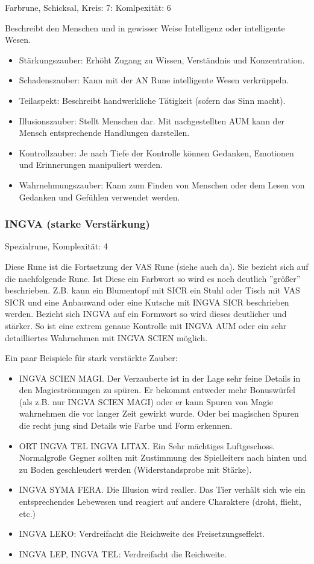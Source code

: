 \documentclass{article}
\begin{document}
Farbrune, Schicksal, Kreis: 7: Komlpexität: 6

Beschreibt den Menschen und in gewisser Weise Intelligenz oder intelligente Wesen.

\begin{itemize}
\item Stärkungszauber: Erhöht Zugang zu Wissen, Verständnis und Konzentration.
\item Schadenszauber: Kann mit der AN Rune intelligente Wesen verkrüppeln.
\item Teilaspekt: Beschreibt handwerkliche Tätigkeit (sofern das Sinn macht).
\item Illusionszauber: Stellt Menschen dar. Mit nachgestellten AUM kann der Mensch entsprechende Handlungen darstellen.
\item Kontrollzauber: Je nach Tiefe der Kontrolle können Gedanken, Emotionen und Erinnerungen manipuliert werden.
\item Wahrnehmungszauber: Kann zum Finden von Menschen oder dem Lesen von Gedanken und Gefühlen verwendet werden.
\end{itemize}

\subsubsection{INGVA (starke Verstärkung)}

Spezialrune, Komplexität: 4

Diese Rune ist die Fortsetzung der VAS Rune (siehe auch da). Sie bezieht sich auf die nachfolgende Rune. Ist Diese
ein Farbwort so wird es noch deutlich ''größer'' beschrieben. Z.B. kann ein Blumentopf mit SICR ein Stuhl oder Tisch
mit VAS SICR und eine Anbauwand oder eine Kutsche mit INGVA SICR beschrieben werden. Bezieht sich INGVA auf ein
Formwort so wird dieses deutlicher und stärker. So ist eine extrem genaue Kontrolle mit INGVA AUM oder ein sehr
detailliertes Wahrnehmen mit INGVA SCIEN möglich.

Ein paar Beispiele für stark verstärkte Zauber:

\begin{itemize}
\item INGVA SCIEN MAGI. Der Verzauberte ist in der Lage sehr feine Details in den Magieströmungen zu spüren. Er bekommt entweder mehr Bonuswürfel (als z.B. nur INGVA SCIEN MAGI) oder er kann Spuren von Magie wahrnehmen die vor langer Zeit gewirkt wurde. Oder bei magischen Spuren die recht jung sind Details wie Farbe und Form erkennen.
\item ORT INGVA TEL INGVA LITAX. Ein Sehr mächtiges Luftgeschoss. Normalgroße Gegner sollten mit Zustimmung des Spielleiters nach hinten und zu Boden geschleudert werden (Widerstandsprobe mit Stärke).
\item INGVA SYMA FERA. Die Illusion wird realler. Das Tier verhält sich wie ein entsprechendes Lebewesen und reagiert auf andere Charaktere (droht, flieht, etc.)
\item INGVA LEKO: Verdreifacht die Reichweite des Freisetzungseffekt.
\item INGVA LEP, INGVA TEL: Verdreifacht die Reichweite.
\end{itemize}
\end{document}
